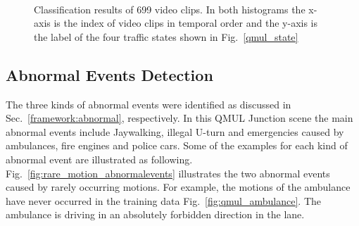 \clearpage
\newpage
\begin{landscape}
	\begin{figure}[h]
		\centering
		\\
		\caption[Classification results of QMUL Junction Dataset]{Classification results of 699 video clips. In both histograms the x-axis is the index of video clips in temporal order and the y-axis is the label of the four traffic states shown in Fig.~\ref{qmul_state}}
		\label{fig:qmul_classification_result}
	\end{figure}
\end{landscape}


\clearpage
\newpage
\subsection{Abnormal Events Detection}
\label{exp:qmul:online classify} 
The three kinds of abnormal events were identified as discussed in Sec.~\ref{framework:abnormal}, respectively. In this QMUL Junction scene the main abnormal events include Jaywalking, illegal U-turn and emergencies caused by ambulances, fire engines and police cars. Some of the examples for each kind of abnormal event are illustrated as following. Fig.~\ref{fig:rare_motion_abnormalevents} illustrates the two abnormal events caused by rarely occurring motions. For example, the motions of the ambulance have never occurred in the training data Fig.~\ref{fig:qmul_ambulance}. The ambulance is driving in an absolutely forbidden direction in the lane.

